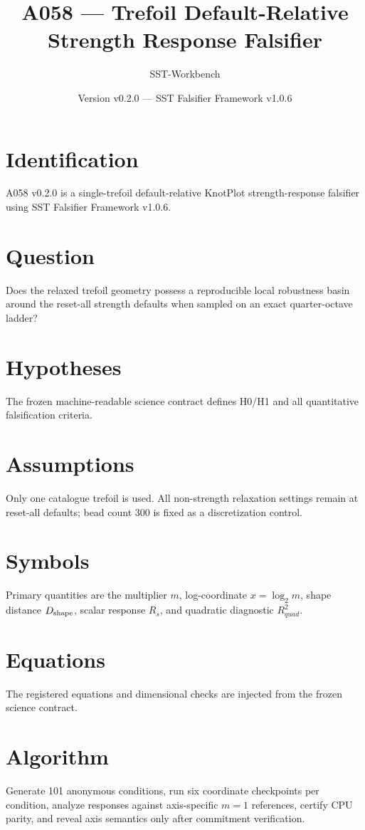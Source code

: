 \documentclass[11pt,a4paper]{article}
\begin{document}
\title{A058 --- Trefoil Default-Relative Strength Response Falsifier}
\author{SST-Workbench}\date{Version v0.2.0 --- SST Falsifier Framework v1.0.6}\maketitle
{}
\section{Identification}
A058 v0.2.0 is a single-trefoil default-relative KnotPlot strength-response falsifier using SST Falsifier Framework v1.0.6.
\section{Question}
Does the relaxed trefoil geometry possess a reproducible local robustness basin around the reset-all strength defaults when sampled on an exact quarter-octave ladder?
\section{Hypotheses}
The frozen machine-readable science contract defines H0/H1 and all quantitative falsification criteria.
\section{Assumptions}
Only one catalogue trefoil is used. All non-strength relaxation settings remain at reset-all defaults; bead count 300 is fixed as a discretization control.
\section{Symbols}
Primary quantities are the multiplier $m$, log-coordinate $x=\log_2m$, shape distance $D_{\rm shape}$, scalar response $R_s$, and quadratic diagnostic $R^2_{quad}$.
\section{Equations}
The registered equations and dimensional checks are injected from the frozen science contract.
\section{Algorithm}
Generate 101 anonymous conditions, run six coordinate checkpoints per condition, analyze responses against axis-specific $m=1$ references, certify CPU parity, and reveal axis semantics only after commitment verification.
\end{document}
